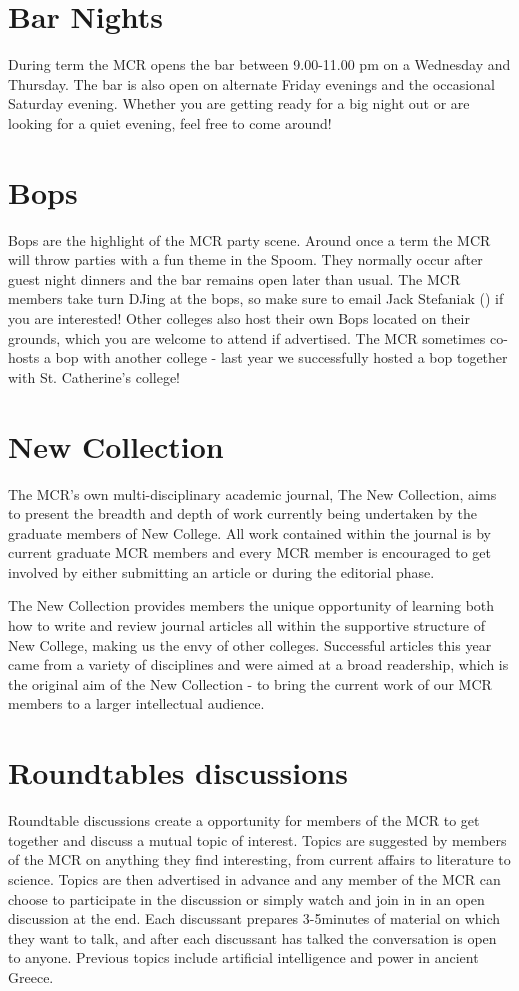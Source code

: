 \section{Bar Nights}
During term the MCR opens the bar between 9.00-11.00 pm on a Wednesday and Thursday. The bar is also open on alternate Friday evenings and the occasional Saturday evening. Whether you are getting ready for a big night out or are looking for a quiet evening, feel free to come around!

\section{Bops}
Bops are the highlight of the MCR party scene. Around once a term the MCR will throw parties with a fun theme in the Spoom. They normally occur after guest night dinners and the bar remains open later than usual. The MCR members take turn DJing at the bops, so make sure to email Jack Stefaniak (\href{mailto:jakub.stefaniak@new.ox.ac.uk}{}) if you are interested! Other colleges also host their own Bops located on their grounds, which you are welcome to attend if advertised. The MCR sometimes co-hosts a bop with another college - last year we successfully hosted a bop together with St. Catherine's college!

\section{New Collection}
The MCR's own multi-disciplinary academic journal, The New Collection, aims to present the breadth and depth of work currently being undertaken by the graduate members of New College. All work contained within the journal is by current graduate MCR members and every MCR member is encouraged to get involved by either submitting an article or during the editorial phase.

The New Collection provides members the unique opportunity of learning both how to write and review journal articles all within the supportive structure of New College, making us the envy of other colleges. Successful articles this year came from a variety of disciplines and were aimed at a broad readership, which is the original aim of the New Collection - to bring the current work of our MCR members to a larger intellectual audience.

\section{Roundtables discussions}
Roundtable discussions create a opportunity for members of the MCR to get together and discuss a mutual topic of interest. Topics are suggested by members of the MCR on anything they find interesting, from current affairs to literature to science. Topics are then advertised in advance and any member of the MCR can choose to participate in the discussion or simply watch and join in in an open discussion at the end. Each discussant prepares 3-5minutes of material on which they want to talk, and after each discussant has talked the conversation is open to anyone. Previous topics include artificial intelligence and power in ancient Greece.

